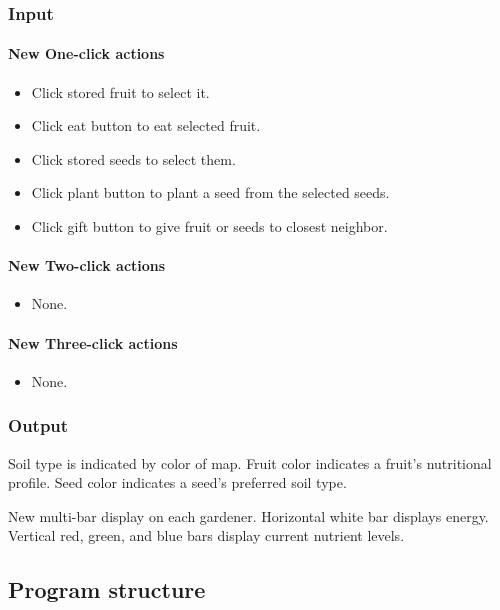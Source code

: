 \documentclass[12pt]{article}
\begin{document}
\subsubsection{Input}

\paragraph{New One-click actions}
\begin{itemize}
\item Click stored fruit to select it.
\item Click eat button to eat selected fruit.
\item Click stored seeds to select them.
\item Click plant button to plant a seed from the selected seeds.
\item Click gift button to give fruit or seeds to closest neighbor.
\end{itemize}

\paragraph{New Two-click actions}
\begin{itemize}
\item None.
\end{itemize}

\paragraph{New Three-click actions}
\begin{itemize}
\item None.
\end{itemize}


\subsubsection{Output}

Soil type is indicated by color of map.
Fruit color indicates a fruit's nutritional profile.
Seed color indicates a seed's preferred soil type.

New multi-bar display on each gardener.  Horizontal white bar displays energy.  Vertical red, green, and blue bars display current nutrient levels.
 

\subsection{Program structure}
\end{document}
